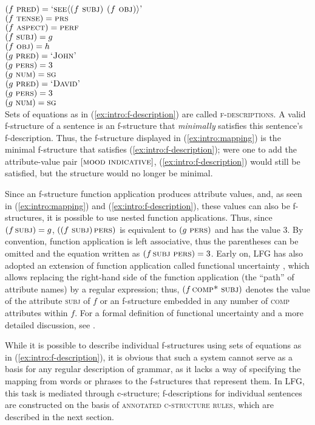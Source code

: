 \documentclass[output=paper]{langscibook}
\begin{document}
 \ea\label{ex:intro:f-description}
 $(f\ \textsc{pred}) = \textsc{`see\arglist{($f$ \textsc{subj}) ($f$ \textsc{obj})}'}$\\
 $(f\ \textsc{tense}) = \textsc{prs}$\\
 $(f\ \textsc{aspect}) = \textsc{perf}$\\
 $(f\ \textsc{subj}) = g$\\
 $(f\ \textsc{obj}) = h$\\\medskip
 $(g\ \textsc{pred}) = \textsc{`John'}$\\
 $(g\ \textsc{pers}) = 3$\\
 $(g\ \textsc{num}) = \textsc{sg}$\\\medskip
 $(g\ \textsc{pred}) = \textsc{`David'}$\\
 $(g\ \textsc{pers}) = 3$\\
 $(g\ \textsc{num}) = \textsc{sg}$\\ 
 \z
Sets of equations as in (\ref{ex:intro:f-description}) are called \textsc{f-descriptions}. A valid f-structure of a sentence is an f-structure that \textit{minimally} satisfies this sentence's f-description. Thus, the f-structure displayed in (\ref{ex:intro:mapping}) is the minimal f-structure that satisfies (\ref{ex:intro:f-description}); were one to add the attribute-value pair $\left[\textsc{mood}~\textsc{indicative}\right]$, (\ref{ex:intro:f-description}) would still be satisfied, but the structure would no longer be minimal.
 
 Since an f-structure function application produces attribute values, and, as seen in (\ref{ex:intro:mapping}) and (\ref{ex:intro:f-description}), these values can also be f-structures, it is possible to use nested function applications. Thus, since $(f\,\textsc{subj}{}) = g$, $((f~\textsc{subj}{})\,\textsc{pers}{})$ is equivalent to $(g~\textsc{pers}{})$ and has the value $3$. By convention, function application is left associative, thus the parentheses can be omitted and the equation written as $(f\,\textsc{subj}{}~\textsc{pers}{})=3$. Early on, LFG has also adopted an extension of function application called functional uncertainty \parencite{kaplzaen89}, which allows replacing the right-hand side of the function application (the ``path'' of attribute names) by a regular expression; thus, $(f\,\textsc{comp*}~\textsc{subj}{})$ denotes the value of the attribute \textsc{subj} of $f$ or an f-structure embedded in any number of \textsc{comp} attributes within $f$. For a formal definition of functional uncertainty and a more detailed discussion, see .
 
 While it is possible to describe individual f-structures using sets of equations as in (\ref{ex:intro:f-description}), it is obvious that such a system cannot serve as a basis for any regular description of grammar, as it lacks a way of specifying the mapping from words or phrases to the f-structures that represent them. In LFG, this task is mediated through c-structure; f-descriptions for individual sentences are constructed on the basis of \textsc{annotated c-structure rules}, which are described in the next section.
\end{document}
